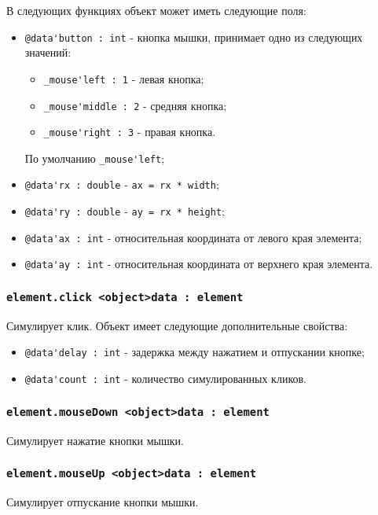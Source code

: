 \documentclass[a4paper, 14pt]{extarticle}
\newenvironment{icItems}
	{ \begin{itemize} [noitemsep,nolistsep] }
	{ \end{itemize} }
\begin{document}
В следующих функциях объект  может иметь следующие поля:
\begin{icItems}
	\item \lstinline|@data'button : int| - кнопка мышки, принимает одно из следующих значений:
	\begin{icItems}
		\item \lstinline|_mouse'left : 1| - левая кнопка;
		\item \lstinline|_mouse'middle : 2| - средняя кнопка;
		\item \lstinline|_mouse'right : 3| - правая кнопка.
	\end{icItems}
	По умолчанию \lstinline|_mouse'left|;
	\item \lstinline|@data'rx : double| - \lstinline|ax = rx * width|;
	\item \lstinline|@data'ry : double| - \lstinline|ay = rx * height|;
	\item \lstinline|@data'ax : int| - относительная координата от левого края элемента;
	\item \lstinline|@data'ay : int| - относительная координата от верхнего края элемента.
\end{icItems}

\subsubsection{\lstinline|element.click <object>data : element|}

Симулирует клик. Объект  имеет следующие дополнительные свойства:
\begin{icItems}
	\item \lstinline|@data'delay : int| - задержка между нажатием и отпускании кнопке;
	\item \lstinline|@data'count : int| - количество симулированных кликов.
\end{icItems}

\subsubsection{\lstinline|element.mouseDown <object>data : element|}

Симулирует нажатие кнопки мышки.

\subsubsection{\lstinline|element.mouseUp <object>data : element|}

Симулирует отпускание кнопки мышки.
\end{document}

